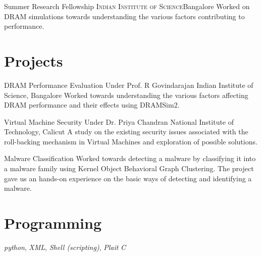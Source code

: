 \documentclass[11pt,a4paper,sans]{moderncv}
\begin{document}
                {Summer Research Fellowship}
                {\textsc{Indian Institute of Science}}{Bangalore}
                {}
                {
                    Worked on  DRAM simulations towards understanding the
                    various factors contributing to performance.
                }


\section{Projects}
    \cventry{}
            {DRAM Performance Evaluation}
            {Under Prof. R Govindarajan}
            {Indian Institute of Science, Bangalore}
            {}
            {
                Worked towards understanding the  various factors affecting DRAM
                performance and their effects using DRAMSim2.
            }

    \cventry{}
            {Virtual Machine Security}
            {Under Dr. Priya Chandran}
            {National Institute of Technology, Calicut}
            {}
            {
                A study on the existing security issues associated with the
                roll-backing mechanism in Virtual Machines and exploration of
                possible solutions.
            }

    \cventry{}
            {Malware Classification}
            {}
            {}
            {}
            {
                Worked towards detecting a malware by classifying it into a
                malware family using Kernel Object Behavioral Graph Clustering.
                The project gave us an hands-on experience on the basic ways of
                detecting and identifying a malware.
            }


\section{Programming}

           {
               \textit{python},
               \textit{XML},
               \textit{Shell (scripting)},
               \textit{Plait}
           }
           {\textit{C}}
\end{document}

